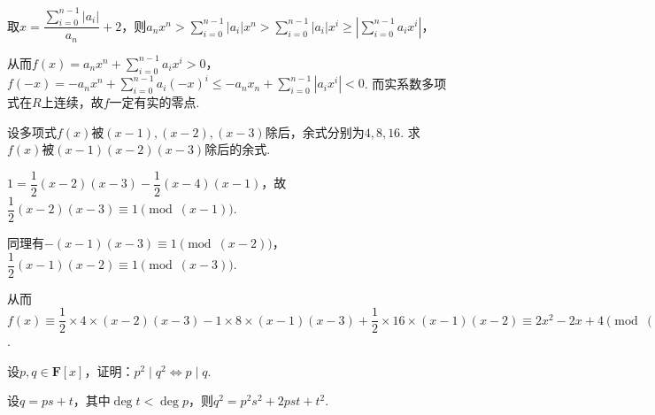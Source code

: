 \begin{exercise}
\begin{exgroup}
\begin{answer}
            取$x=\dfrac{\displaystyle\sum_{i=0}^{n-1}|a_i|}{a_n}+2$，则$a_nx^n>\displaystyle\sum_{i=0}^{n-1}|a_i|x^n>\displaystyle\sum_{i=0}^{n-1}|a_i|x^i\geqslant |\displaystyle\sum_{i=0}^{n-1}a_ix^i|$，

            从而$f(x)=a_nx^n+\displaystyle\sum_{i=0}^{n-1}a_ix^i>0$，$f(-x)=-a_nx^n+\displaystyle\sum_{i=0}^{n-1}a_i(-x)^i\leqslant -a_nx_n+\displaystyle\sum_{i=0}^{n-1}|a_ix^i|<0$.
            而实系数多项式在$R$上连续，故$f$一定有实的零点.
        \end{answer}

    \end{exgroup}

    \begin{exgroup}
        \item 设多项式$f(x)$被$(x-1),(x-2),(x-3)$除后，余式分别为$4,8,16$. 求$f(x)$被$(x-1)(x-2)(x-3)$除后的余式.
        \begin{answer}
            $1=\dfrac{1}{2}(x-2)(x-3)-\dfrac{1}{2}(x-4)(x-1)$，故$\dfrac{1}{2}(x-2)(x-3) \equiv1\pmod{(x-1)}$.

            同理有$-(x-1)(x-3)\equiv1\pmod{(x-2)}$，$\dfrac{1}{2}(x-1)(x-2)\equiv1\pmod{(x-3)}$.

            从而$f(x)\equiv\dfrac{1}{2}\times 4 \times(x-2)(x-3)-1\times 8\times(x-1)(x-3)+\dfrac{1}{2}\times 16\times(x-1)(x-2)\equiv 2x^2-2x+4\pmod{(x-1)(x-2)(x-3)}$.
        \end{answer}
        \item 设$p,q\in\mathbf{F}[x]$，证明：$p^2 \mid q^2\iff p \mid q$.
        \begin{answer}
            设$q=ps+t$，其中$\deg t<\deg p$，则$q^2=p^2s^2+2pst+t^2$.


\end{answer}
\end{exgroup}
\end{exercise}
